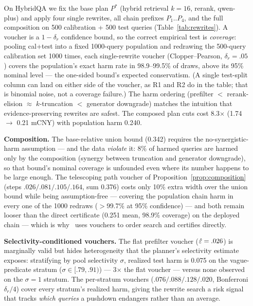 On HybridQA we fix the base plan $P^\ast$ (hybrid retrieval $k{=}16$,
rerank, qwen-plus) and apply four single rewrites, all chain prefixes
$P_1..P_4$, and the full composition on 500 calibration + 500 test
queries (Table~\ref{tab:rewrites}). A voucher is a $1-\delta_r$
confidence bound, so the correct empirical test is \emph{coverage}:
pooling cal+test into a fixed 1000-query population and redrawing the
500-query calibration set 1000 times, each single-rewrite voucher
(Clopper--Pearson, $\delta_r{=}.05$) covers the population's exact harm
rate in 98.9--99.5\% of draws, above its 95\% nominal level --- the
one-sided bound's expected conservatism. (A single test-split column
can land on either side of the voucher, as R1 and R2 do in the table;
that is binomial noise, not a coverage failure.) The harm ordering
(prefilter $<$ rerank-elision $\approx$ $k$-truncation $<$ generator
downgrade) matches the intuition that evidence-preserving rewrites are
safest. The composed plan cuts cost 8.3$\times$ (1.74 $\to$ 0.21 mCNY)
with population harm 0.240.

\textbf{Composition.} The base-relative union bound (0.342) requires the
no-synergistic-harm assumption --- and the data \emph{violate} it: 8\% of
harmed queries are harmed only by the composition (synergy between
truncation and generator downgrade), so that bound's nominal coverage is
unfounded even where its number happens to be large enough. The
telescoping path voucher of Proposition~\ref{prop:composition}
(steps $.026/.081/.105/.164$, sum 0.376) costs only 10\% extra width
over the union bound while being assumption-free --- covering the
population chain harm in every one of the 1000 redraws ($>$99.7\% at
95\% confidence) --- and both remain
looser than the direct certificate (0.251 mean, 98.9\% coverage) on the
deployed chain --- which is why \system\ uses vouchers to order search
and certifies directly.

\textbf{Selectivity-conditioned vouchers.} The flat prefilter voucher
($\hat{\varepsilon} = .026$) is marginally valid but hides heterogeneity that the
planner's selectivity estimate exposes: stratifying by pool selectivity
$\sigma$, realized test harm is 0.075 on the vague-predicate stratum
($\sigma \in [.79, .91)$) --- 3$\times$ the flat voucher --- versus
none observed on the $\sigma = 1$ stratum. The per-stratum vouchers
($.076/.088/.128/.020$, Bonferroni $\delta_r/4$) cover every stratum's
realized harm, giving the rewrite search a risk signal that tracks
\emph{which queries} a pushdown endangers rather than an average.


